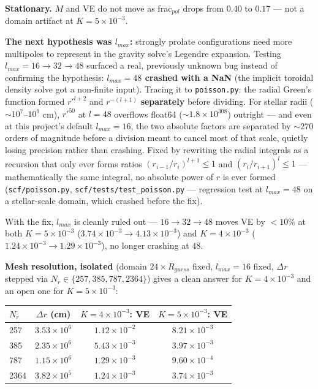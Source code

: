 \documentclass[11pt,a4paper]{scrartcl}
\newcommand{\code}[1]{\texttt{\small #1}}
\begin{document}
\textbf{Stationary.} $M$ and VE do not move as frac$_{pol}$ drops from
$0.40$ to $0.17$ --- not a domain artifact at $K=5\times10^{-3}$.

\textbf{The next hypothesis was $l_{max}$:} strongly prolate
configurations need more multipoles to represent in the gravity solve's
Legendre expansion. Testing $l_{max}=16\to32\to48$ surfaced a real,
previously unknown bug instead of confirming the hypothesis:
\textbf{$l_{max}=48$ crashed with a NaN} (the implicit toroidal density
solve got a non-finite input). Tracing it to \code{poisson.py}: the
radial Green's function formed $r'^{l+2}$ and $r^{-(l+1)}$
\textbf{separately} before dividing. For stellar radii
($\sim10^7$--$10^9$ cm), $r'^{50}$ at $l=48$ overflows float64
($\sim1.8\times10^{308}$) outright --- and even at this project's
default $l_{max}=16$, the two absolute factors are separated by
$\sim270$ orders of magnitude before a division meant to cancel most of
that scale, quietly losing precision rather than crashing. Fixed by
rewriting the radial integrals as a recursion that only ever forms
ratios $(r_{i-1}/r_i)^{l+1}\le1$ and $(r_i/r_{i+1})^l\le1$ ---
mathematically the same integral, no absolute power of $r$ is ever
formed (\code{scf/poisson.py}, \code{scf/tests/test\_poisson.py} ---
regression test at $l_{max}=48$ on a stellar-scale domain, which
crashed before the fix).

With the fix, $l_{max}$ is cleanly ruled out --- $16\to32\to48$ moves
VE by $<10\%$ at both $K=5\times10^{-3}$
($3.74\times10^{-3}\to4.13\times10^{-3}$) and $K=4\times10^{-3}$
($1.24\times10^{-3}\to1.29\times10^{-3}$), no longer crashing at $48$.

\textbf{Mesh resolution, isolated} (domain $24\times R_{guess}$ fixed,
$l_{max}=16$ fixed, $\Delta r$ stepped via $N_r\in\{257,385,787,2364\}$)
gives a clean answer for $K=4\times10^{-3}$ and an open one for
$K=5\times10^{-3}$:

\begin{center}
\begin{tabular}{@{}lccc@{}}
\toprule
$N_r$ & $\Delta r$ (cm) & $K{=}4{\times}10^{-3}$: VE & $K{=}5{\times}10^{-3}$: VE\\
\midrule
257  & $3.53\times10^6$ & $1.12\times10^{-2}$ & $8.21\times10^{-3}$\\
385  & $2.35\times10^6$ & $5.43\times10^{-3}$ & $3.97\times10^{-3}$\\
787  & $1.15\times10^6$ & $1.29\times10^{-3}$ & $9.60\times10^{-4}$\\
2364 & $3.82\times10^5$ & $1.24\times10^{-3}$ & $3.74\times10^{-3}$\\
\bottomrule
\end{tabular}
\end{center}
\end{document}
